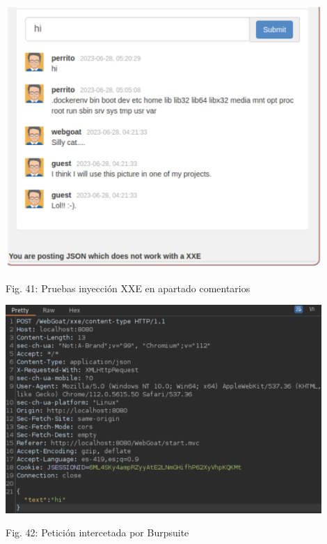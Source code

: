 \documentclass[12pt,oneside,a4paper]{book}
\begin{document}
\begin{enumerate}
\begin{enumerate}
        \newpage

        \begin{center}
            \includegraphics[width=12cm]{img/xxe4.png}
            
            \vspace{0.1em}
            
            Fig. 41: Pruebas inyección XXE en apartado comentarios
        \end{center}
        
        \vspace{2em}

        \begin{center}
            \includegraphics[width=12cm]{img/xxe5.png}
            
            \vspace{0.1em}
            
            Fig. 42: Petición intercetada por Burpsuite
        \end{center}
        

\end{enumerate}
\end{enumerate}
\end{document}
